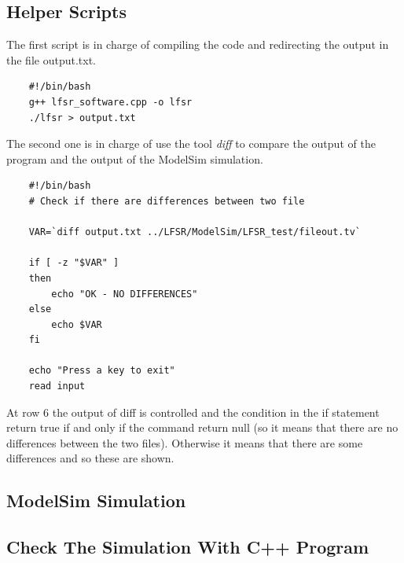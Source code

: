 \documentclass[a4paper]{report}
\begin{document}
\subsection{Helper Scripts}
The first script is in charge of compiling the code and redirecting the output in the file output.txt.
\lstset{ %
	language=sh }
\begin{lstlisting}	
	#!/bin/bash
	g++ lfsr_software.cpp -o lfsr
	./lfsr > output.txt
\end{lstlisting}

\noindent The second one is in charge of use the tool \emph{diff} to compare the output of the program and the output of the ModelSim simulation.
\begin{lstlisting}	
	#!/bin/bash
	# Check if there are differences between two file
	
	VAR=`diff output.txt ../LFSR/ModelSim/LFSR_test/fileout.tv`
	
	if [ -z "$VAR" ]
	then
		echo "OK - NO DIFFERENCES"
	else
		echo $VAR
	fi
	
	echo "Press a key to exit"
	read input
\end{lstlisting}

\noindent At row 6 the output of diff is controlled and the condition in the if statement return true if and only if the command return null (so it means that there are no differences between the two files). Otherwise it means that there are some differences and so these are shown.

\subsection{ModelSim Simulation}
\subsection{Check The Simulation With C++ Program}
\end{document}
